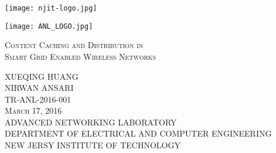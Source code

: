 \documentclass[journal,12pt,onecolumn]{IEEEtran}
\begin{document}
\begin{titlepage}
\begin{center}
\vspace*{-2\baselineskip}
\begin{minipage}[l]{7cm}
\flushleft
\texttt{[image: njit-logo.jpg]}
\end{minipage}
\hfill
\begin{minipage}[r]{7cm}
\flushright
\texttt{[image: ANL\_LOGO.jpg]}\end{minipage}

\vfill

\textsc{\LARGE Content Caching and Distribution in\\ [12pt]
Smart Grid Enabled Wireless Networks}

\vfill
\textsc{\LARGE XUEQING HUANG\\[12pt]
\LARGE NIRWAN ANSARI}\\
\vfill
\textsc{\LARGE TR-ANL-2016-001\\[12pt]
\LARGE March 17, 2016}\\[1.5cm]
\vfill
{ADVANCED NETWORKING LABORATORY\\
 DEPARTMENT OF ELECTRICAL AND COMPUTER ENGINEERING\\
 NEW JERSY INSTITUTE OF TECHNOLOGY}
\end{center}
\end{titlepage}
\end{document}
